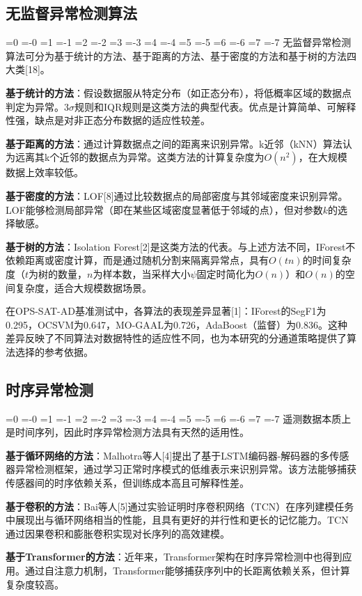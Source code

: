 \documentclass[12pt, a4paper]{article}
\newcommand{\zihao}[1]{%
    \ifnum#1=0 {\fontsize{42pt}{50pt}\selectfont}%
    \else\ifnum#1=-0 {\fontsize{36pt}{44pt}\selectfont}%
    \else\ifnum#1=1 {\fontsize{26pt}{32pt}\selectfont}%
    \else\ifnum#1=-1 {\fontsize{24pt}{28pt}\selectfont}%
    \else\ifnum#1=2 {\fontsize{22pt}{26pt}\selectfont}%
    \else\ifnum#1=-2 {\fontsize{18pt}{22pt}\selectfont}%
    \else\ifnum#1=3 {\fontsize{16pt}{20pt}\selectfont}%
    \else\ifnum#1=-3 {\fontsize{15pt}{18pt}\selectfont}%
    \else\ifnum#1=4 {\fontsize{14pt}{17pt}\selectfont}%
    \else\ifnum#1=-4 {\fontsize{12pt}{15pt}\selectfont}%
    \else\ifnum#1=5 {\fontsize{10.5pt}{13pt}\selectfont}%
    \else\ifnum#1=-5 {\fontsize{9pt}{11pt}\selectfont}%
    \else\ifnum#1=6 {\fontsize{7.5pt}{9pt}\selectfont}%
    \else\ifnum#1=-6 {\fontsize{6.5pt}{8pt}\selectfont}%
    \else\ifnum#1=7 {\fontsize{5.5pt}{7pt}\selectfont}%
    \else\ifnum#1=-7 {\fontsize{5pt}{6pt}\selectfont}%
    \fi\fi\fi\fi\fi\fi\fi\fi\fi\fi\fi\fi\fi\fi\fi\fi
}
\newcommand{\songti}{\CJKfontspec{SimSun}}
\begin{document}
\subsection{无监督异常检测算法}

\zihao{5}\songti
无监督异常检测算法可分为基于统计的方法、基于距离的方法、基于密度的方法和基于树的方法四大类[18]。

\textbf{基于统计的方法}：假设数据服从特定分布（如正态分布），将低概率区域的数据点判定为异常。3$\sigma$规则和IQR规则是这类方法的典型代表。优点是计算简单、可解释性强，缺点是对非正态分布数据的适应性较差。

\textbf{基于距离的方法}：通过计算数据点之间的距离来识别异常。k近邻（kNN）算法认为远离其k个近邻的数据点为异常。这类方法的计算复杂度为$O(n^2)$，在大规模数据上效率较低。

\textbf{基于密度的方法}：LOF[8]通过比较数据点的局部密度与其邻域密度来识别异常。LOF能够检测局部异常（即在某些区域密度显著低于邻域的点），但对参数$k$的选择敏感。

\textbf{基于树的方法}：Isolation Forest[2]是这类方法的代表。与上述方法不同，IForest不依赖距离或密度计算，而是通过随机分割来隔离异常点，具有$O(tn)$的时间复杂度（$t$为树的数量，$n$为样本数，当采样大小$\psi$固定时简化为$O(n)$）和$O(n)$的空间复杂度，适合大规模数据场景。

在OPS-SAT-AD基准测试中，各算法的表现差异显著[1]：IForest的SegF1为0.295，OCSVM为0.647，MO-GAAL为0.726，AdaBoost（监督）为0.836。这种差异反映了不同算法对数据特性的适应性不同，也为本研究的分通道策略提供了算法选择的参考依据。

\subsection{时序异常检测}

\zihao{5}\songti
遥测数据本质上是时间序列，因此时序异常检测方法具有天然的适用性。

\textbf{基于循环网络的方法}：Malhotra等人[4]提出了基于LSTM编码器-解码器的多传感器异常检测框架，通过学习正常时序模式的低维表示来识别异常。该方法能够捕获传感器间的时序依赖关系，但训练成本高且可解释性差。

\textbf{基于卷积的方法}：Bai等人[5]通过实验证明时序卷积网络（TCN）在序列建模任务中展现出与循环网络相当的性能，且具有更好的并行性和更长的记忆能力。TCN通过因果卷积和膨胀卷积实现对长序列的高效建模。

\textbf{基于Transformer的方法}：近年来，Transformer架构在时序异常检测中也得到应用。通过自注意力机制，Transformer能够捕获序列中的长距离依赖关系，但计算复杂度较高。
\end{document}
